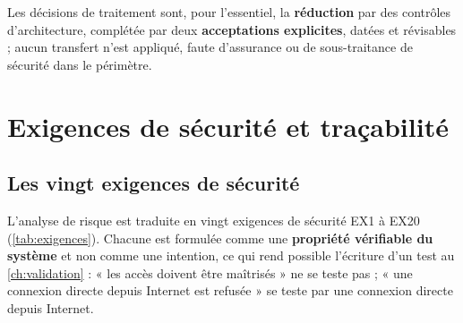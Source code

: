 Les décisions de traitement sont, pour l'essentiel, la \textbf{réduction} par des contrôles
d'architecture, complétée par deux \textbf{acceptations explicites}, datées et révisables ; aucun
transfert n'est appliqué, faute d'assurance ou de sous-traitance de sécurité dans le périmètre.

\section{Exigences de sécurité et traçabilité}

\subsection{Les vingt exigences de sécurité}

L'analyse de risque est traduite en vingt exigences de sécurité EX1 à EX20
(\cref{tab:exigences}). Chacune est formulée comme une \textbf{propriété vérifiable du
système} et non comme une intention, ce qui rend possible l'écriture d'un test au \cref{ch:validation} :
« les accès doivent être maîtrisés » ne se teste pas ; « une connexion directe depuis Internet
est refusée » se teste par une connexion directe depuis Internet.

